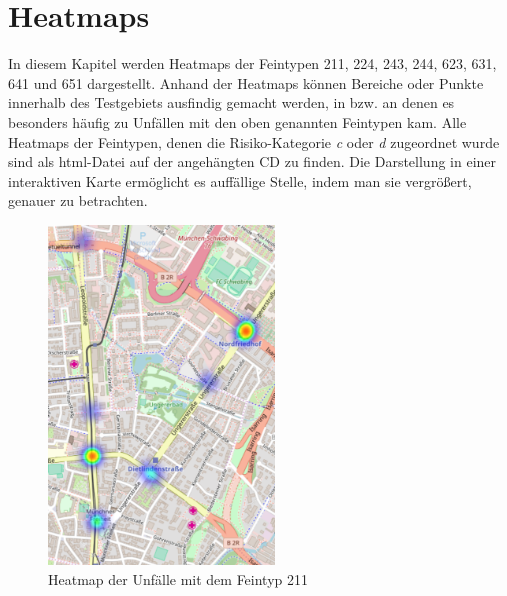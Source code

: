 
\chapter{Heatmaps}\label{chapter:Heatmaps}

In diesem Kapitel werden Heatmaps der Feintypen 211, 224, 243, 244, 623, 631, 641 und 651 dargestellt. Anhand der Heatmaps können Bereiche oder Punkte innerhalb des Testgebiets ausfindig gemacht werden, in bzw. an denen es besonders häufig zu Unfällen mit den oben genannten Feintypen kam. Alle Heatmaps der Feintypen, denen die Risiko-Kategorie \textit{c} oder \textit{d} zugeordnet wurde sind als html-Datei auf der angehängten CD zu finden. Die Darstellung in einer interaktiven Karte ermöglicht es auffällige Stelle, indem man sie vergrößert, genauer zu betrachten.

\begin{savenotes}
	\begin{figure}[H]
		\centering
		\includegraphics[width=6cm,height=9cm]{figures/HM_211}
		\caption[Heatmap der Unfälle mit dem Feintyp 211]{Heatmap der Unfälle mit dem Feintyp 211}\label{fig:Heatmap_211}
	\end{figure}
\end{savenotes}

